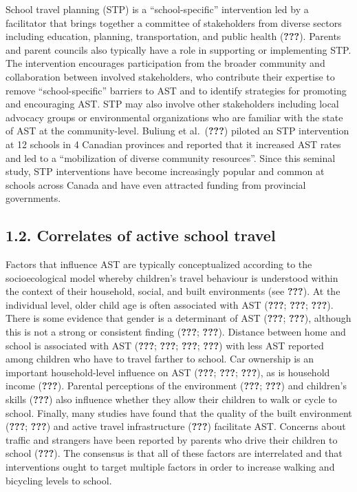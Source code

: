 \documentclass[]{elsarticle} %
\begin{document}
School travel planning (STP) is a ``school-specific'' intervention led
by a facilitator that brings together a committee of stakeholders from
diverse sectors including education, planning, transportation, and
public health ({\textbf{???}}). Parents and parent councils also
typically have a role in supporting or implementing STP. The
intervention encourages participation from the broader community and
collaboration between involved stakeholders, who contribute their
expertise to remove ``school-specific'' barriers to AST and to identify
strategies for promoting and encouraging AST. STP may also involve other
stakeholders including local advocacy groups or environmental
organizations who are familiar with the state of AST at the
community-level. Buliung et al.~({\textbf{???}}) piloted an STP
intervention at 12 schools in 4 Canadian provinces and reported that it
increased AST rates and led to a ``mobilization of diverse community
resources''. Since this seminal study, STP interventions have become
increasingly popular and common at schools across Canada and have even
attracted funding from provincial governments.

\hypertarget{correlates-of-active-school-travel}{%
\subsection{1.2. Correlates of active school
travel}\label{correlates-of-active-school-travel}}

Factors that influence AST are typically conceptualized according to the
socioecological model whereby children's travel behaviour is understood
within the context of their household, social, and built environments
(see {\textbf{???}}). At the individual level, older child age is often
associated with AST ({\textbf{???}}; {\textbf{???}}; {\textbf{???}}).
There is some evidence that gender is a determinant of AST
({\textbf{???}}; {\textbf{???}}), although this is not a strong or
consistent finding ({\textbf{???}}; {\textbf{???}}). Distance between
home and school is associated with AST ({\textbf{???}}; {\textbf{???}};
{\textbf{???}}; {\textbf{???}}) with less AST reported among children
who have to travel farther to school. Car ownership is an important
household-level influence on AST ({\textbf{???}}; {\textbf{???}};
{\textbf{???}}), as is household income ({\textbf{???}}). Parental
perceptions of the environment ({\textbf{???}}; {\textbf{???}}) and
children's skills ({\textbf{???}}) also influence whether they allow
their children to walk or cycle to school. Finally, many studies have
found that the quality of the built environment ({\textbf{???}};
{\textbf{???}}) and active travel infrastructure ({\textbf{???}})
facilitate AST. Concerns about traffic and strangers have been reported
by parents who drive their children to school ({\textbf{???}}). The
consensus is that all of these factors are interrelated and that
interventions ought to target multiple factors in order to increase
walking and bicycling levels to school.
\end{document}
